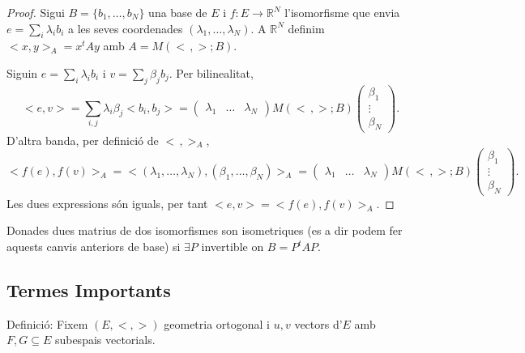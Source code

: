 \documentclass[12pt]{article}
\newcommand{\R}{\mathbb{R}}
\begin{document}
\begin{proof}
    Sigui $B=\{b_1,\dots,b_N\}$ una base de $E$ i $f:E\rightarrow\R^N$ l'isomorfisme que envia $e=\sum_i\lambda_ib_i$ a les seves coordenades $(\lambda_1,\dots,\lambda_N)$. A $\R^N$ definim $< x,y>_A=x^tAy$ amb $A=M(<\,,>;B)$.

    Siguin $e=\sum_i\lambda_ib_i$ i $v=\sum_j\beta_jb_j$. Per bilinealitat,
    \[
    < e,v>=\sum_{i,j}\lambda_i\beta_j< b_i,b_j>=
    \begin{pmatrix}\lambda_1&\dots&\lambda_N\end{pmatrix}M(<\,,>;B)\begin{pmatrix}\beta_1\\ \vdots\\ \beta_N\end{pmatrix}.
    \]
    D'altra banda, per definició de $<\,,>_A$,
    \[
    < f(e),f(v)>_A=<(\lambda_1,\dots,\lambda_N),(\beta_1,\dots,\beta_N)>_A=
    \begin{pmatrix}\lambda_1&\dots&\lambda_N\end{pmatrix}M(<\,,>;B)\begin{pmatrix}\beta_1\\ \vdots\\ \beta_N\end{pmatrix}.
    \]
    Les dues expressions són iguals, per tant $< e,v>=< f(e),f(v)>_A$.
\end{proof}

\noindent Donades dues matrius de dos isomorfismes son isometriques (es a dir podem fer aquests canvis anteriors de base) si $\exists P$ invertible on $\boxed{B = P^tAP}$.

\subsection{Termes Importants}

\noindent Definició: Fixem $(E, <,>)$ geometria ortogonal i $u, v$ vectors d'$E$ amb $F,G \subseteq E$ subespais vectorials.
\end{document}
